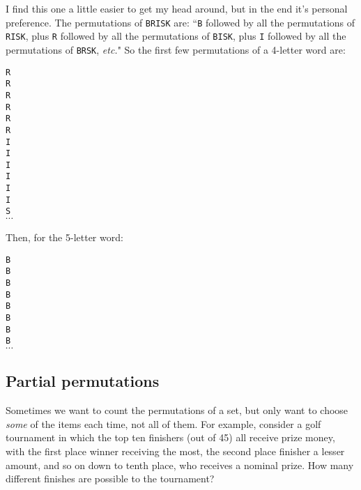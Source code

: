 I find this one a little easier to get my head around, but in the end it's
personal preference. The permutations of \texttt{BRISK} are: ``\texttt{B}
followed by all the permutations of \texttt{RISK}, plus \texttt{R} followed
by all the permutations of \texttt{BISK}, plus \texttt{I} followed by all
the permutations of \texttt{BRSK}, \textit{etc.}" So the first few
permutations of a 4-letter word are:
\begin{center}
\texttt{R } \\
\texttt{R } \\
\texttt{R } \\
\texttt{R } \\
\texttt{R } \\
\texttt{R } \\
\texttt{I } \\
\texttt{I } \\
\texttt{I } \\
\texttt{I } \\
\texttt{I } \\
\texttt{I } \\
\texttt{S } \\
$\cdots$
\end{center}

Then, for the 5-letter word:
\begin{center}
\texttt{B } \\
\texttt{B } \\
\texttt{B } \\
\texttt{B } \\
\texttt{B } \\
\texttt{B } \\
\texttt{B } \\
\texttt{B } \\
$\cdots$
\end{center}


\subsection{Partial permutations}

Sometimes we want to count the permutations of a set, but only want to
choose \textit{some} of the items each time, not all of them. For example,
consider a golf tournament in which the top ten finishers (out of 45) all
receive prize money, with the first place winner receiving the most, the
second place finisher a lesser amount, and so on down to tenth place, who
receives a nominal prize. How many different finishes are possible to the
tournament?

